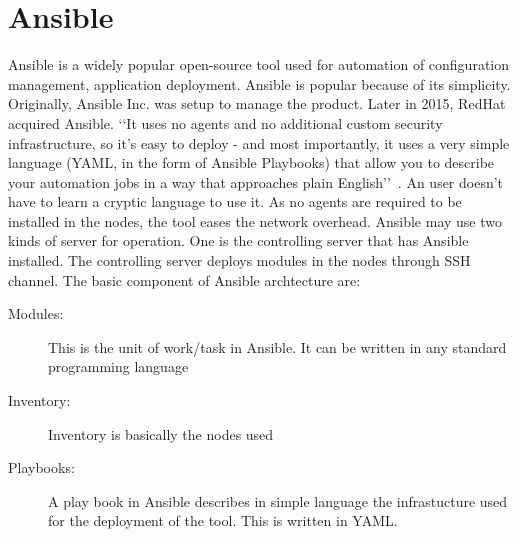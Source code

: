 \section{Ansible}
Ansible is a widely popular open-source tool used for automation of
configuration management, application deployment. Ansible is popular
because of its simplicity. Originally, Ansible Inc. was setup to
manage the product. Later in 2015, RedHat acquired Ansible.
‘‘It uses no agents and no additional custom security infrastructure,
so it’s easy to deploy - and most importantly, it uses a very simple
language (YAML, in the form of Ansible Playbooks) that allow you to
describe your automation jobs in a way that approaches plain
English’’~\cite{hid-sp18-417-doc-Ansible}.
An user doesn’t have to learn a cryptic language to use it.  As no
agents are required to be installed in the nodes, the tool eases the
network overhead. Ansible may use two kinds of server for operation. One is the
controlling server that has Ansible installed.  The controlling server
deploys modules in the nodes through SSH channel.
The basic component of Ansible archtecture are: 
\begin{description}
\item[Modules:] This is the unit of work/task in Ansible. It
  can be written in any standard programming language
\item[Inventory:] Inventory is basically the nodes used
\item[Playbooks:] A play book in Ansible describes in simple
  language the infrastucture used for the deployment of the tool. This
  is written in YAML.
\end{description}
